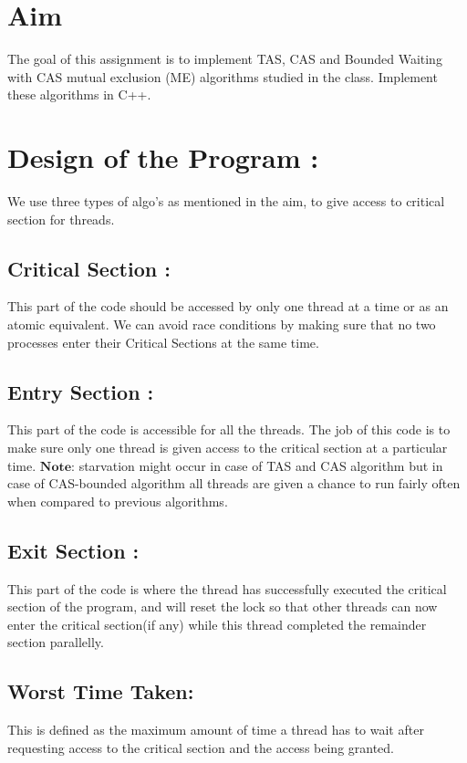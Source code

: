 \documentclass[12pt]{article}
\begin{document}
\maketitle

\section{Aim}
The goal of this assignment is to implement TAS, CAS and Bounded Waiting with CAS
mutual exclusion (ME) algorithms studied in the class. Implement these algorithms in C++.

\section{Design of the Program :}
We use three types of algo's as mentioned in the aim, to give access to critical section for threads.
\subsection{Critical Section :}
This part of the code should be accessed by only one thread at a time or as an atomic equivalent.
We can avoid race conditions by making sure that no two processes enter their Critical Sections at the same time.
\subsection{Entry Section :}
This part of the code is accessible for all the threads. The job of this code is to make sure only one thread is given access to the critical section at a particular time.
$\textbf{Note:}$ starvation might occur in case of TAS and CAS algorithm but in case of CAS-bounded algorithm all threads are given a chance to run fairly often when compared to previous algorithms.
\subsection{Exit Section :}
This part of the code is where the thread has successfully executed the critical section of the program, and will reset the lock so that other threads can now enter the critical section(if any) while this thread completed the remainder section parallelly.
\subsection{Worst Time Taken:}
This is defined as the maximum amount of time a thread has to wait after requesting access to the critical section and the access being granted.
\end{document}
